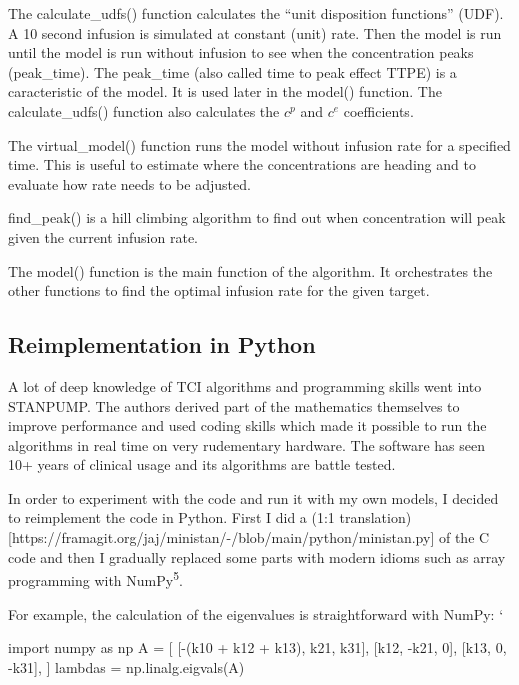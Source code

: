 \documentclass[
  letterpaper,
  DIV=11,
  numbers=noendperiod]{scrartcl}
\newenvironment{Shaded}{\begin{snugshade}}{\end{snugshade}}
\newcommand{\DecValTok}[1]{\textcolor[rgb]{0.68,0.00,0.00}{#1}}
\newcommand{\ImportTok}[1]{\textcolor[rgb]{0.00,0.46,0.62}{#1}}
\newcommand{\NormalTok}[1]{\textcolor[rgb]{0.00,0.23,0.31}{#1}}
\newcommand{\OperatorTok}[1]{\textcolor[rgb]{0.37,0.37,0.37}{#1}}
\begin{document}
The calculate\_udfs() function calculates the ``unit disposition
functions'' (UDF). A 10 second infusion is simulated at constant (unit)
rate. Then the model is run until the model is run without infusion to
see when the concentration peaks (peak\_time). The peak\_time (also
called time to peak effect TTPE) is a caracteristic of the model. It is
used later in the model() function. The calculate\_udfs() function also
calculates the \(c^p\) and \(c^e\) coefficients.

The virtual\_model() function runs the model without infusion rate for a
specified time. This is useful to estimate where the concentrations are
heading and to evaluate how rate needs to be adjusted.

find\_peak() is a hill climbing algorithm to find out when concentration
will peak given the current infusion rate.

The model() function is the main function of the algorithm. It
orchestrates the other functions to find the optimal infusion rate for
the given target.

\subsection{Reimplementation in
Python}\label{reimplementation-in-python}

A lot of deep knowledge of TCI algorithms and programming skills went
into STANPUMP. The authors derived part of the mathematics themselves to
improve performance and used coding skills which made it possible to run
the algorithms in real time on very rudementary hardware. The software
has seen 10+ years of clinical usage and its algorithms are battle
tested.

In order to experiment with the code and run it with my own models, I
decided to reimplement the code in Python. First I did a (1:1
translation){[}https://framagit.org/jaj/ministan/-/blob/main/python/ministan.py{]}
of the C code and then I gradually replaced some parts with modern
idioms such as array programming with NumPy\textsuperscript{5}.

For example, the calculation of the eigenvalues is straightforward with
NumPy: `

\begin{Shaded}
\begin{Highlighting}[]
\ImportTok{import}\NormalTok{ numpy }\ImportTok{as}\NormalTok{ np}
\NormalTok{A }\OperatorTok{=}\NormalTok{ [}
\NormalTok{    [}\OperatorTok{{-}}\NormalTok{(k10 }\OperatorTok{+}\NormalTok{ k12 }\OperatorTok{+}\NormalTok{ k13), k21, k31],}
\NormalTok{    [k12, }\OperatorTok{{-}}\NormalTok{k21, }\DecValTok{0}\NormalTok{],}
\NormalTok{    [k13, }\DecValTok{0}\NormalTok{, }\OperatorTok{{-}}\NormalTok{k31],}
\NormalTok{]}
\NormalTok{lambdas }\OperatorTok{=}\NormalTok{ np.linalg.eigvals(A)}
\end{Highlighting}
\end{Shaded}
\end{document}
